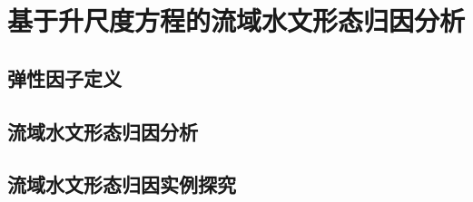 

\chapter{基于升尺度方程的流域水文形态归因分析}
\label{cha:intro}

\section{弹性因子定义}
\section{流域水文形态归因分析}
\section{流域水文形态归因实例探究}
 

 

